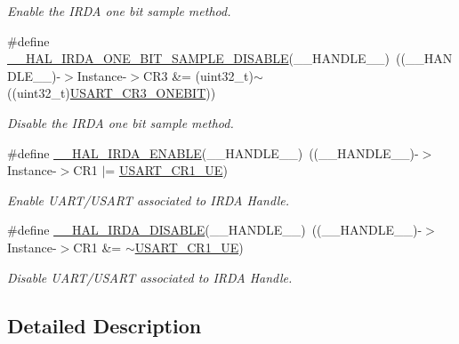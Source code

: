 \begin{DoxyCompactItemize}
\begin{DoxyCompactList}\small\item\em Enable the I\+R\+DA one bit sample method. \end{DoxyCompactList}\item 
\#define \hyperlink{group___i_r_d_a___exported___macros_ga68c1c53595fe30df9e25d6bfea0c421f}{\+\_\+\+\_\+\+H\+A\+L\+\_\+\+I\+R\+D\+A\+\_\+\+O\+N\+E\+\_\+\+B\+I\+T\+\_\+\+S\+A\+M\+P\+L\+E\+\_\+\+D\+I\+S\+A\+B\+LE}(\+\_\+\+\_\+\+H\+A\+N\+D\+L\+E\+\_\+\+\_\+)~((\+\_\+\+\_\+\+H\+A\+N\+D\+L\+E\+\_\+\+\_\+)-\/$>$Instance-\/$>$C\+R3 \&= (uint32\+\_\+t)$\sim$((uint32\+\_\+t)\hyperlink{group___peripheral___registers___bits___definition_ga9a96fb1a7beab602cbc8cb0393593826}{U\+S\+A\+R\+T\+\_\+\+C\+R3\+\_\+\+O\+N\+E\+B\+IT}))
\begin{DoxyCompactList}\small\item\em Disable the I\+R\+DA one bit sample method. \end{DoxyCompactList}\item 
\#define \hyperlink{group___i_r_d_a___exported___macros_ga94d14e3105494108f4ba6f69aa1728a7}{\+\_\+\+\_\+\+H\+A\+L\+\_\+\+I\+R\+D\+A\+\_\+\+E\+N\+A\+B\+LE}(\+\_\+\+\_\+\+H\+A\+N\+D\+L\+E\+\_\+\+\_\+)~((\+\_\+\+\_\+\+H\+A\+N\+D\+L\+E\+\_\+\+\_\+)-\/$>$Instance-\/$>$C\+R1 $\vert$=  \hyperlink{group___peripheral___registers___bits___definition_ga2bb650676aaae4a5203f372d497d5947}{U\+S\+A\+R\+T\+\_\+\+C\+R1\+\_\+\+UE})
\begin{DoxyCompactList}\small\item\em Enable U\+A\+R\+T/\+U\+S\+A\+RT associated to I\+R\+DA Handle. \end{DoxyCompactList}\item 
\#define \hyperlink{group___i_r_d_a___exported___macros_gaf049a81f535415532182a2bb10cbee1d}{\+\_\+\+\_\+\+H\+A\+L\+\_\+\+I\+R\+D\+A\+\_\+\+D\+I\+S\+A\+B\+LE}(\+\_\+\+\_\+\+H\+A\+N\+D\+L\+E\+\_\+\+\_\+)~((\+\_\+\+\_\+\+H\+A\+N\+D\+L\+E\+\_\+\+\_\+)-\/$>$Instance-\/$>$C\+R1 \&=  $\sim$\hyperlink{group___peripheral___registers___bits___definition_ga2bb650676aaae4a5203f372d497d5947}{U\+S\+A\+R\+T\+\_\+\+C\+R1\+\_\+\+UE})
\begin{DoxyCompactList}\small\item\em Disable U\+A\+R\+T/\+U\+S\+A\+RT associated to I\+R\+DA Handle. \end{DoxyCompactList}\end{DoxyCompactItemize}


\subsection{Detailed Description}


